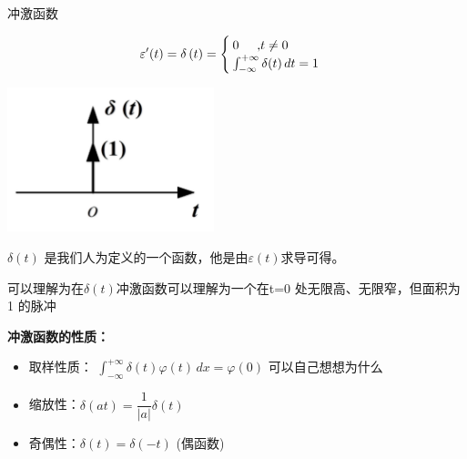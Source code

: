 \documentclass[UTF8,a4paper,12pt]{ctexart}
\begin{document}
    \begin{titlebox}{冲激函数}
      
      $$\varepsilon'(t)= \delta \left( t \right)=
      \begin{cases}
       0 \text{\hspace{0.5cm},$t\ne 0$}\\
       \int_{-\infty }^{+\infty } \delta(t) \, dt=1
      \end{cases}$$
      \begin{center}
        \par \includegraphics[width=6cm]{picture/deta_signal.png}
      \end{center}
      \begin{flushleft}
        $\delta(t)$ 是我们人为定义的一个函数，他是由$ \varepsilon (t)$求导可得。
        \par 可以理解为在$\delta(t)$冲激函数可以理解为一个在t=0 处无限高、无限窄，但面积为 1 的脉冲
      \end{flushleft}
       \par \textbf{冲激函数的性质：}
       \begin{itemize} 
        \item 取样性质： $\int_{-\infty }^{+\infty } \delta(t)\varphi(t)  \, dx=\varphi(0) $ {\scriptsize 可以自己想想为什么}  
        \item 缩放性：$\delta (at) =\dfrac{1}{|a|}  \delta ( t ) $
        \item 奇偶性：$\delta ( t )=\delta ( -t ) $ (偶函数)
        
      \end{itemize}
    \end{titlebox}
      
\end{document}
